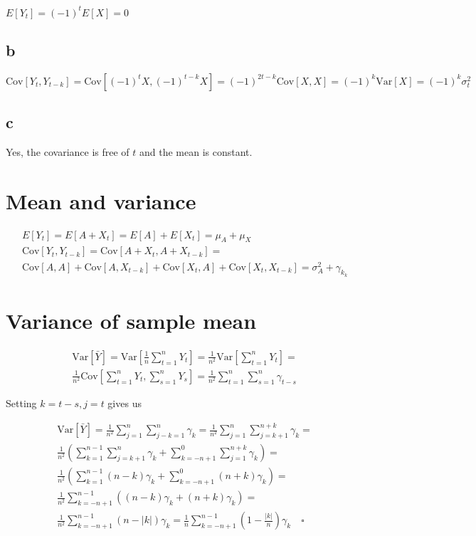 \documentclass[]{book}
\theoremstyle{definition}
\theoremstyle{definition}
\theoremstyle{remark}
\begin{document}
\(E[Y_t] = (-1)^tE[X] = 0\)

\subsection*{b}\label{b-11}

\(\text{Cov}[Y_t, Y_{t-k}] = \text{Cov}[(-1)^tX, (-1)^{t-k}X] = (-1)^{2t-k}\text{Cov}[X, X] = (-1)^k \text{Var}[X] = (-1)^k\sigma_t^2\)

\subsection*{c}\label{c-5}

Yes, the covariance is free of \(t\) and the mean is constant.

\section{Mean and variance}\label{mean-and-variance}

\begin{gather*}
  E[Y_t] = E[A + X_t] = E[A] + E[X_t] = \mu_A + \mu_X\\
  \text{Cov}[Y_t, Y_{t-k}] = \text{Cov}[A + X_t, A+ X_{t-k}] = \\
  \text{Cov}[A, A] + \text{Cov}[A, X_{t-k}] + \text{Cov}[X_t, A] + \text{Cov}[X_t, X_{t-k}] = \sigma_A^2 + \gamma_{k_k}
\end{gather*}

\section{Variance of sample mean}\label{variance-of-sample-mean}

\begin{gather*}
  \text{Var}[\bar{Y}] = \text{Var}\left[ \frac{1}{n} \sum_{t=1}^n Y_t \right] = \frac{1}{n^2} \text{Var}\left[ \sum_{t=1}^n Y_t \right] = \\
  \frac{1}{n^2}\text{Cov}\left[ \sum_{t=1}^n Y_t, \sum_{s=1}^n Y_s \right] = \frac{1}{n^2} \sum_{t=1}^n \sum_{s=1}^n \gamma_{t-s}
\end{gather*}

Setting \(k = t-s, j = t\) gives us

\begin{gather*}
  \text{Var}[\bar{Y}] = \frac{1}{n^2} \sum_{j=1}^n \sum_{j-k=1}^n \gamma_k = \frac{1}{n^2} \sum_{j=1}^n \sum_{j=k+1}^{n+k} \gamma_k = \\
  \frac{1}{n^2} \left( \sum_{k=1}^{n-1} \sum_{j=k+1}^{n} \gamma_k + \sum_{k=-n+1}^0 \sum_{j=1}^{n+k} \gamma_k \right) = \\
  \frac{1}{n^2} \left( \sum_{k=1}^{n-1} (n-k)\gamma_k + \sum_{k=-n+1}^0 (n+k)\gamma_k \right) = \\
  \frac{1}{n^2} \sum_{k=-n+1}^{n-1} \left( (n-k)\gamma_k + (n+k)\gamma_k \right) = \\
  \frac{1}{n^2} \sum_{k=-n+1}^{n-1} (n-|k|)\gamma_k = \frac{1}{n} \sum_{k=-n+1}^{n-1} \left(1-\frac{|k|}{n}\right)\gamma_k \quad \square
\end{gather*}
\end{document}
